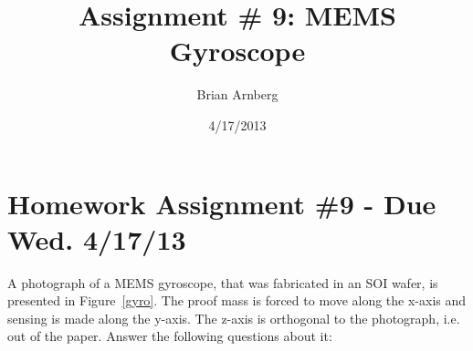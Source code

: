 \documentclass{article}
\title{Assignment \# 9: MEMS Gyroscope}
\date{4/17/2013}
\author{Brian Arnberg}
\begin{document}
\label{start}



\section*{ Homework Assignment \#9 - Due Wed. 4/17/13 }

A photograph of a MEMS gyroscope, that was fabricated in an SOI 
wafer, is presented in Figure~\ref{gyro}. The proof mass is 
forced to move along the x-axis and sensing is made along the 
y-axis. The z-axis is orthogonal to the photograph, i.e. out
of the paper. Answer the following questions about it:

\renewcommand{\labelenumi}{\arabic{enumi})}
\end{document}
